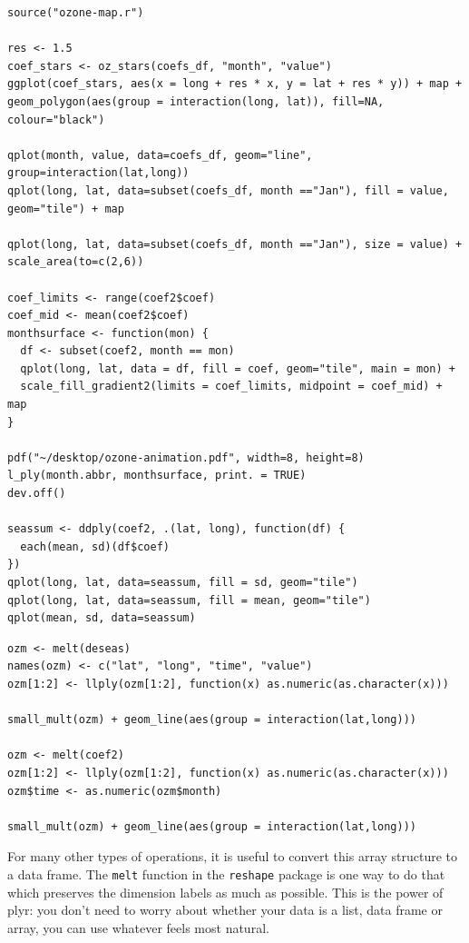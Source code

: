 \documentclass[letterpage]{scrartcl}
\begin{document}
\begin{verbatim}
source("ozone-map.r")

res <- 1.5
coef_stars <- oz_stars(coefs_df, "month", "value")
ggplot(coef_stars, aes(x = long + res * x, y = lat + res * y)) + map + geom_polygon(aes(group = interaction(long, lat)), fill=NA, colour="black")

qplot(month, value, data=coefs_df, geom="line", group=interaction(lat,long))
qplot(long, lat, data=subset(coefs_df, month =="Jan"), fill = value, 
geom="tile") + map

qplot(long, lat, data=subset(coefs_df, month =="Jan"), size = value) + scale_area(to=c(2,6))

coef_limits <- range(coef2$coef)
coef_mid <- mean(coef2$coef)
monthsurface <- function(mon) {
  df <- subset(coef2, month == mon)
  qplot(long, lat, data = df, fill = coef, geom="tile", main = mon) + 
  scale_fill_gradient2(limits = coef_limits, midpoint = coef_mid) + map
}

pdf("~/desktop/ozone-animation.pdf", width=8, height=8)
l_ply(month.abbr, monthsurface, print. = TRUE)
dev.off()

seassum <- ddply(coef2, .(lat, long), function(df) {
  each(mean, sd)(df$coef)
})
qplot(long, lat, data=seassum, fill = sd, geom="tile")
qplot(long, lat, data=seassum, fill = mean, geom="tile")
qplot(mean, sd, data=seassum)
\end{verbatim}

\begin{verbatim}
ozm <- melt(deseas)
names(ozm) <- c("lat", "long", "time", "value")
ozm[1:2] <- llply(ozm[1:2], function(x) as.numeric(as.character(x)))

small_mult(ozm) + geom_line(aes(group = interaction(lat,long)))

ozm <- melt(coef2)
ozm[1:2] <- llply(ozm[1:2], function(x) as.numeric(as.character(x)))
ozm$time <- as.numeric(ozm$month)

small_mult(ozm) + geom_line(aes(group = interaction(lat,long)))

\end{verbatim}


For many other types of operations, it is useful to convert this array structure to a data frame.  The {\tt melt} function in the {\tt reshape} package is one way to do that which preserves the dimension labels as much as possible.  This is the power of plyr: you don't need to worry about whether your data is a list, data frame or array, you can use whatever feels most natural.
\end{document}
